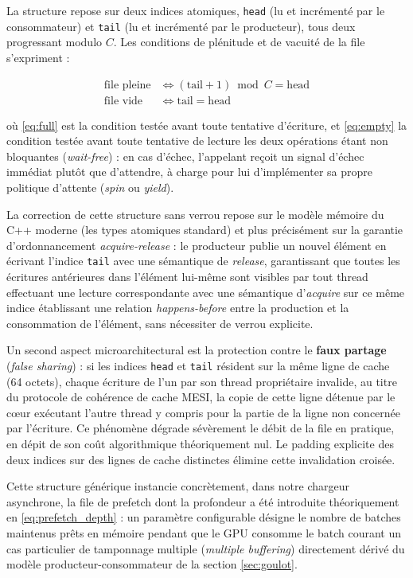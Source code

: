 \documentclass[12pt,a4paper]{report}
\begin{document}
La structure repose sur deux indices atomiques, \texttt{head} (lu et incrémenté par le consommateur) et \texttt{tail} (lu et incrémenté par le producteur), tous deux progressant modulo $C$. Les conditions de plénitude et de vacuité de la file s'expriment :

\begin{align}
\text{file pleine} &\iff (\text{tail} + 1) \bmod C = \text{head} \label{eq:full}\\
\text{file vide} &\iff \text{tail} = \text{head} \label{eq:empty}
\end{align}

où \eqref{eq:full} est la condition testée avant toute tentative d'écriture, et \eqref{eq:empty} la condition testée avant toute tentative de lecture les deux opérations étant non bloquantes (\textit{wait-free}) : en cas d'échec, l'appelant reçoit un signal d'échec immédiat plutôt que d'attendre, à charge pour lui d'implémenter sa propre politique d'attente (\textit{spin} ou \textit{yield}).

La correction de cette structure sans verrou repose sur le modèle mémoire du C++ moderne (les types atomiques standard) et plus précisément sur la garantie d'ordonnancement \textit{acquire-release} : le producteur publie un nouvel élément en écrivant l'indice \texttt{tail} avec une sémantique de \textit{release}, garantissant que toutes les écritures antérieures dans l'élément lui-même sont visibles par tout thread effectuant une lecture correspondante avec une sémantique d'\textit{acquire} sur ce même indice établissant une relation \textit{happens-before} entre la production et la consommation de l'élément, sans nécessiter de verrou explicite.

Un second aspect microarchitectural est la protection contre le \textbf{faux partage} (\textit{false sharing}) : si les indices \texttt{head} et \texttt{tail} résident sur la même ligne de cache (64 octets), chaque écriture de l'un par son thread propriétaire invalide, au titre du protocole de cohérence de cache MESI, la copie de cette ligne détenue par le cœur exécutant l'autre thread y compris pour la partie de la ligne non concernée par l'écriture. Ce phénomène dégrade sévèrement le débit de la file en pratique, en dépit de son coût algorithmique théoriquement nul. Le padding explicite des deux indices sur des lignes de cache distinctes élimine cette invalidation croisée.

Cette structure générique instancie concrètement, dans notre chargeur asynchrone, la file de prefetch dont la profondeur a été introduite théoriquement en \eqref{eq:prefetch_depth} : un paramètre configurable désigne le nombre de batches maintenus prêts en mémoire pendant que le GPU consomme le batch courant un cas particulier de tamponnage multiple (\textit{multiple buffering}) directement dérivé du modèle producteur-consommateur de la section \ref{sec:goulot}.
\end{document}
